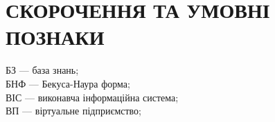 \chapter*{СКОРОЧЕННЯ ТА УМОВНІ ПОЗНАКИ}
{}

{\Large

\noindent БЗ --- база знань; \\
БНФ --- Бекуса-Наура форма; \\
ВІС --- виконавча інформаційна система; \\
ВП --- віртуальне підприємство;

}

